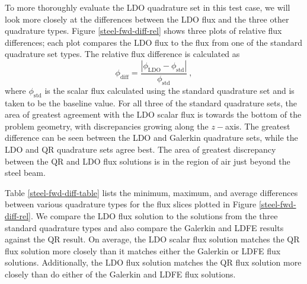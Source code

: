 \documentclass{article} %
\begin{document}
To more thoroughly evaluate the LDO quadrature set in this test case, we will
look more closely at the differences between the LDO flux and
the three other quadrature types. Figure \ref{steel-fwd-diff-rel} shows three
plots of relative flux differences; each plot compares the LDO
flux to the flux from one of the standard quadrature set types. The relative
flux difference is calculated as
%
\begin{equation}
\phi_{\mathrm{diff}} = 
\frac{\left|\phi_{\mathrm{LDO}}-\phi_{\mathrm{std}}\right|}{\phi_{\mathrm{std}}}\:,
\label{flux-diff}
\end{equation}
%
where $\phi_{\mathrm{std}}$ is the scalar flux calculated using the 
standard quadrature set and is taken to be the baseline value. For all three
of the standard quadrature sets, the area of greatest agreement with the LDO
scalar flux is towards the bottom of the problem geometry, with discrepancies
growing along the $z-$axis. The greatest difference can be seen between the LDO
and Galerkin quadrature sets, while the LDO and QR quadrature sets agree best.
The area of greatest discrepancy between the QR and LDO flux solutions is in
the region of air just beyond the steel beam.

Table \ref{steel-fwd-diff-table} lists the minimum, maximum, and average
differences between various quadrature types for the flux slices plotted in
Figure \ref{steel-fwd-diff-rel}. We compare the LDO flux
solution to the solutions from the three standard quadrature
types and also compare the Galerkin and LDFE results against the QR result. On
average, the LDO scalar flux solution matches the QR flux solution more
closely than it matches either the Galerkin or LDFE flux solutions.
Additionally, the LDO flux solution matches the QR flux solution more closely
than do either of the Galerkin and LDFE flux solutions.
\end{document}
